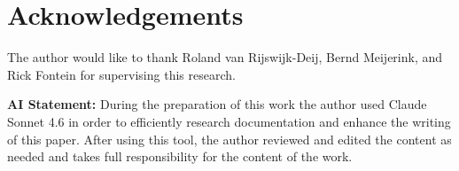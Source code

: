 \section{Acknowledgements}

The author would like to thank Roland van Rijswijk-Deij, Bernd Meijerink, and Rick Fontein 
for supervising this research.

\textbf{AI Statement:} During the preparation of this work the author used Claude Sonnet 4.6 in order to
efficiently research documentation and enhance the writing of this paper. After 
using this tool, the author reviewed and edited the content as needed
and takes full responsibility for the content of the work.
